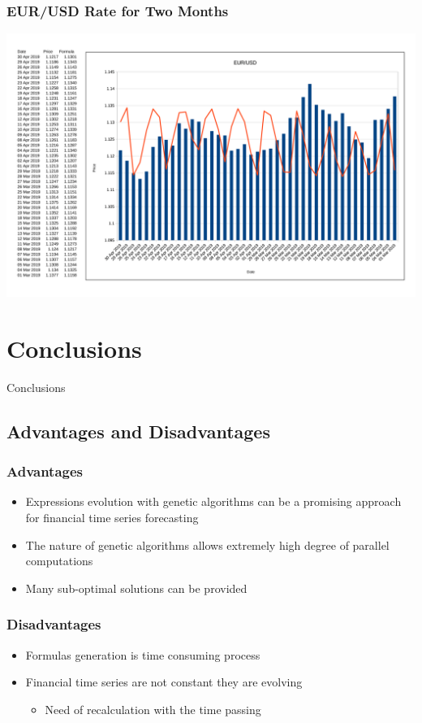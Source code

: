 \documentclass{beamer}
\begin{document}
\begin{frame}
\frametitle{EUR/USD Rate for Two Months}
\includegraphics[scale=0.09]{fig01.png}
\end{frame}

\section{Conclusions}

\begin{frame}
\center \huge{Conclusions}
\end{frame}

\subsection{Advantages and Disadvantages}

\begin{frame}
\frametitle{Advantages}
\begin{itemize}
	\item Expressions evolution with genetic algorithms can be a promising approach for financial time series forecasting
	\item The nature of genetic algorithms allows extremely high degree of parallel computations
	\item Many sub-optimal solutions can be provided
\end{itemize}
\end{frame}

\begin{frame}
\frametitle{Disadvantages}
\begin{itemize}
	\item Formulas generation is time consuming process
	\item Financial time series are not constant they are evolving
	\begin{itemize}
		\item Need of recalculation with the time passing
	\end{itemize}
\end{itemize}
\end{frame}
\end{document}
